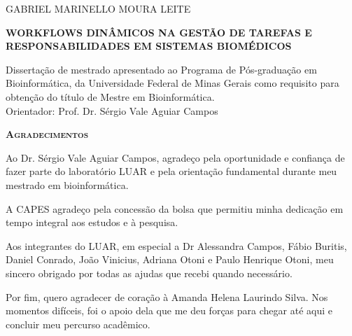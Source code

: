 \documentclass[12pt]{article}
\begin{document}
    \begin{titlepage}
        
        \center \textsc{\fontsize{14}{12}\selectfont GABRIEL MARINELLO MOURA LEITE} \\
        
        \vspace*{8cm}
        
        \newcommand{\HRule}{\rule{\linewidth}{0.5mm}}
        \textsc{\fontsize{16}{12}\selectfont \textbf{
        WORKFLOWS DINÂMICOS NA GESTÃO DE TAREFAS E\\RESPONSABILIDADES EM SISTEMAS BIOMÉDICOS}}\\[0.2cm] 
        
        \vspace*{2cm}
        
        \hspace{.3\textwidth}
        \begin{minipage}{.6\textwidth}
        \fontsize{10}{12}\selectfont Dissertação de mestrado apresentado ao Programa de Pós-graduação em Bioinformática, da Universidade Federal de Minas Gerais como requisito para obtenção do título de Mestre em Bioinformática. \\
        \linebreak
        Orientador: Prof. Dr. Sérgio Vale Aguiar Campos \\
        \end{minipage}
        
        \vspace*{\fill}
        
    \end{titlepage}
    
    \newpage
    \begin{titlepage}
        {\center \textsc{\fontsize{16}{16}\selectfont \textbf{Agradecimentos}} \\}

        Ao Dr. Sérgio Vale Aguiar Campos, agradeço pela oportunidade e confiança de fazer parte do laboratório LUAR e pela orientação fundamental durante meu mestrado em bioinformática.

        A CAPES agradeço pela concessão da bolsa que permitiu minha dedicação em tempo integral aos estudos e à pesquisa.

        Aos integrantes do LUAR, em especial a Dr Alessandra Campos, Fábio Buritis, Daniel Conrado, João Vinicius, Adriana Otoni e Paulo Henrique Otoni, meu sincero obrigado por todas as ajudas que recebi quando necessário.

        Por fim, quero agradecer de coração à Amanda Helena Laurindo Silva. Nos momentos difíceis, foi o apoio dela que me deu forças para chegar até aqui e concluir meu percurso acadêmico.
        
    \end{titlepage}
    
\end{document}
